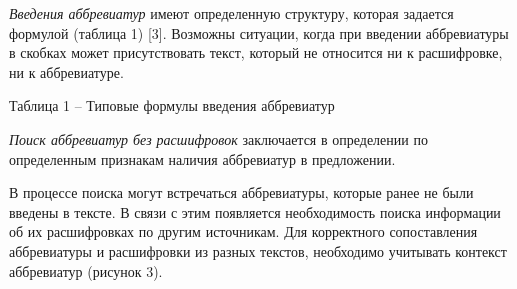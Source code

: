 \documentclass[14pt]{extarticle}
\begin{document}
\textit{Введения аббревиатур} имеют определенную структуру, которая задается формулой (таблица 1) [3]. Возможны ситуации, когда при введении аббревиатуры в скобках может присутствовать текст, который не относится ни к расшифровке, ни к аббревиатуре. 

\newpage

Таблица 1 – Типовые формулы введения аббревиатур


\begin{table}[h]
\end{table}

\textit{Поиск аббревиатур без расшифровок} заключается в определении по определенным признакам наличия аббревиатур в предложении.

В процессе поиска могут встречаться аббревиатуры, которые ранее не были введены в тексте. В связи с этим появляется необходимость поиска информации об их расшифровках по другим источникам. Для корректного сопоставления аббревиатуры и расшифровки из разных текстов, необходимо учитывать контекст аббревиатур (рисунок 3). 
\end{document}
